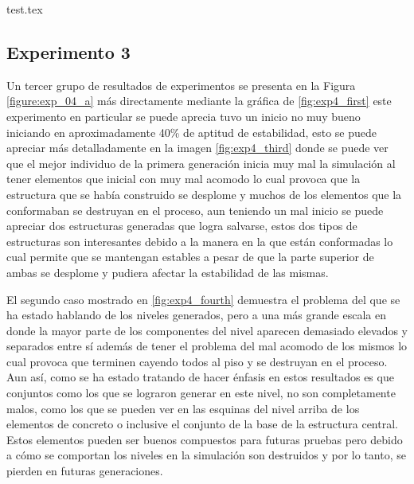 {test.tex}

\newpage

\subsection{Experimento 3}
\label{chap6:exp_3}

Un tercer grupo de resultados de experimentos se presenta en la Figura
\ref{figure:exp_04_a} más directamente mediante la gráfica de
\ref{fig:exp4_first} este experimento en particular se puede aprecia tuvo un
inicio no muy bueno iniciando en aproximadamente 40\% de aptitud de estabilidad,
esto se puede apreciar más detalladamente en la imagen \ref{fig:exp4_third}
donde se puede ver que el mejor individuo de la primera generación inicia muy
mal la simulación al tener elementos que inicial con muy mal acomodo lo cual
provoca que la estructura que se había construido se desplome y muchos de los
elementos que la conformaban se destruyan en el proceso, aun teniendo un mal
inicio se puede apreciar dos estructuras generadas que logra salvarse, estos dos
tipos de estructuras son interesantes debido a la manera en la que están
conformadas lo cual permite que se mantengan estables a pesar de que la parte
superior de ambas se desplome y pudiera afectar la estabilidad de las mismas. 

El segundo caso mostrado en \ref{fig:exp4_fourth} demuestra el problema del que
se ha estado hablando de los niveles generados, pero a una más grande escala en
donde la mayor parte de los componentes del nivel aparecen demasiado elevados y
separados entre sí además de tener el problema del mal acomodo de los mismos lo
cual provoca que terminen cayendo todos al piso y se destruyan en el proceso.
Aun así, como se ha estado tratando de hacer énfasis en estos resultados es que
conjuntos como los que se lograron generar en este nivel, no son completamente
malos, como los que se pueden ver en las esquinas del nivel arriba de los
elementos de concreto o inclusive el conjunto de la base de la estructura
central. Estos elementos pueden ser buenos compuestos para futuras pruebas pero
debido a cómo se comportan los niveles en la simulación son
destruidos y por lo tanto, se pierden en futuras generaciones. 

